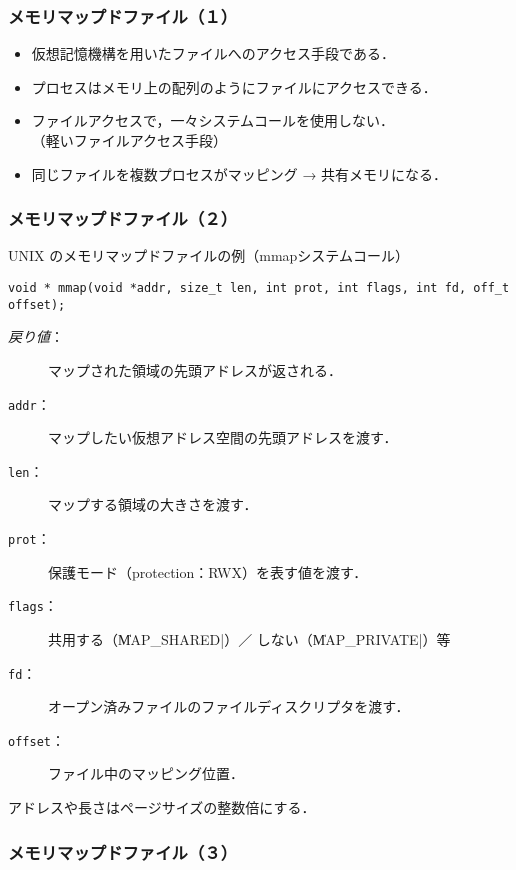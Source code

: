 \documentclass{beamer}                   %
\begin{document}
\begin{frame}
  \frametitle{メモリマップドファイル（１）}
  \begin{itemize}
  \item 仮想記憶機構を用いたファイルへのアクセス手段である．
  \item プロセスはメモリ上の配列のようにファイルにアクセスできる．
  \item ファイルアクセスで，一々システムコールを使用しない．\\
    （軽いファイルアクセス手段）
  \item 同じファイルを複数プロセスがマッピング → 共有メモリになる．
  \end{itemize}
\end{frame}

\begin{frame}[fragile]
  \frametitle{メモリマップドファイル（２）}
  UNIX のメモリマップドファイルの例（mmapシステムコール）

\begin{lstlisting}[numbers=none]
void * mmap(void *addr, size_t len, int prot, int flags, int fd, off_t offset);
\end{lstlisting}

  \begin{description}
  \item[\emph{戻り値}：] マップされた領域の先頭アドレスが返される．
  \item[\texttt{addr}：] マップしたい仮想アドレス空間の先頭アドレスを渡す．
  \item[\texttt{len}：] マップする領域の大きさを渡す．
  \item[\texttt{prot}：] 保護モード（protection：RWX）を表す値を渡す．
  \item[\texttt{flags}：]共用する（\|MAP_SHARED|）／
    しない（\|MAP_PRIVATE|）等
  \item[\texttt{fd}：] オープン済みファイルのファイルディスクリプタを渡す．
  \item[\texttt{offset}：] ファイル中のマッピング位置．
  \end{description}

  アドレスや長さはページサイズの整数倍にする．
\end{frame}

\begin{frame}
  \frametitle{メモリマップドファイル（３）}
\end{frame}
\end{document}
